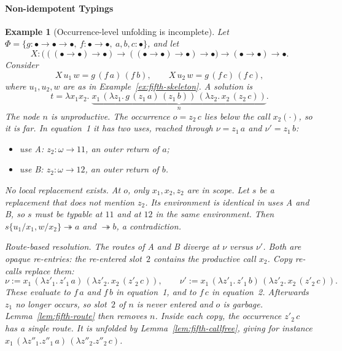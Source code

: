 \documentclass[10pt,a4paper]{article}
\theoremstyle{plain}%
\newtheorem{example}[theorem]{Example}
\begin{document}
\paragraph{Non-idempotent Typings}

\begin{example}[Occurrence-level unfolding is incomplete]\label{ex:fifth-clash}
Let $\Phi = \{g : \bullet\to\bullet\to\bullet,\ f : \bullet\to\bullet,\ a,b,c : \bullet\}$, and let
\[
X : \big(((\bullet\to\bullet)\to\bullet) \to ((\bullet\to\bullet)\to\bullet) \to \bullet\big) \to (\bullet\to\bullet) \to \bullet .
\]
Consider
\[
X\,u_1\,w = g\,(f\,a)\,(f\,b), \qquad X\,u_2\,w = g\,(f\,c)\,(f\,c),
\]
where $u_1, u_2, w$ are as in Example~\ref{ex:fifth-skeleton}.
A solution is
\[
t = \lambda x_1x_2.\; \underbrace{x_1\,(\lambda z_1.\, g\,(z_1\,a)\,(z_1\,b))\,(\lambda z_2.\, x_2\,(z_2\,c))}_{n} .
\]
The node $n$ is unproductive.
The occurrence $o = z_2\,c$ lies below the call $x_2(\cdot)$, so it is far.
In equation~1 it has two uses, reached through $\nu = z_1\,a$ and $\nu' = z_1\,b$:
\begin{itemize}
\item use A: $z_2 : \omega \to 11$, an outer return of $a$;
\item use B: $z_2 : \omega \to 12$, an outer return of $b$.
\end{itemize}

\emph{No local replacement exists.}
At $o$, only $x_1, x_2, z_2$ are in scope.
Let $s$ be a replacement that does not mention $z_2$.
Its environment is identical in uses A and B, so $s$ must be typable at $11$ and at $12$ in the same environment.
Then $s\{u_1/x_1, w/x_2\} \twoheadrightarrow a$ and $\twoheadrightarrow b$, a contradiction.

\emph{Route-based resolution.}
The routes of A and B diverge at $\nu$ versus $\nu'$.
Both are opaque re-entries: the re-entered slot~$2$ contains the productive call $x_2$.
Copy re-calls replace them:
\[
\nu := x_1\,(\lambda z'_1.\,z'_1\,a)\,(\lambda z'_2.\,x_2\,(z'_2\,c)),
\qquad
\nu' := x_1\,(\lambda z'_1.\,z'_1\,b)\,(\lambda z'_2.\,x_2\,(z'_2\,c)).
\]
These evaluate to $f\,a$ and $f\,b$ in equation~1, and to $f\,c$ in equation~2.
Afterwards $z_1$ no longer occurs, so slot~$2$ of $n$ is never entered and $o$ is garbage.
Lemma~\ref{lem:fifth-route} then removes $n$.
Inside each copy, the occurrence $z'_2\,c$ has a single route.
It is unfolded by Lemma~\ref{lem:fifth-callfree}, giving for instance $x_1\,(\lambda z''_1.z''_1\,a)\,(\lambda z''_2.z''_2\,c)$.
\end{example}
\end{document}
